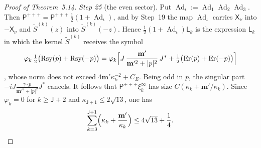 \documentclass[11pt]{amsart}
\theoremstyle{definition}
\begin{document}
\begin{proof}[Proof of Theorem~5.14]
\emph{Step 25} (the even sector).
Put $\operatorname{Ad}_\iota:=\allowbreak \operatorname{Ad}_1\operatorname{Ad}_2\operatorname{Ad}_3$.
Then $\mathsf P^{+++}=\allowbreak \mathsf P^{+++}\,\allowbreak \frac12(1+\operatorname{Ad}_\iota)$, and by Step~19 the map $\operatorname{Ad}_\iota$ carries $\mathsf X_\nu$ into $-\mathsf X_\nu$ and $\tilde S^{(k)}(z)$ into $\tilde S^{(k)}(-z)$.
Hence $\frac12(1+\operatorname{Ad}_\iota)\mathsf L_k$ is the expression $\mathsf L_k$ in which the kernel $\tilde S^{(k)}$ receives the symbol
\begin{equation*}
\varphi_k\,\tfrac12\bigl(\mathrm{Rsy}(p)+\mathrm{Rsy}(-p)\bigr)=\varphi_k\Bigl[J\,\frac{\mathbf m'}{\mathbf m'^2+|p|^2}\,J^*+\tfrac12\bigl(\mathrm{Er}(p)+\mathrm{Er}(-p)\bigr)\Bigr]
\end{equation*}
\cite[Proposition~37.1\,(f)]{QEDIII}, whose norm does not exceed $4\mathbf m'\kappa_k^{-2}+C_E$.
Being odd in $p$, the singular part $-iJ\frac{\gamma\cdot p}{\mathbf m'^2+|p|^2}J^*$ cancels.
It follows that $\mathsf P^{+++}\xi_k^\infty$ has size $C(\kappa_k+\mathbf m'/\kappa_k)$.
Since $\varphi_k=0$ for $k\ge\mathsf J+2$ and $\kappa_{\mathsf J+1}\le2\sqrt{13}$, one has
\begin{equation*}
\sum_{k=3}^{\mathsf J+1}\Bigl(\kappa_k+\frac{\mathbf m'}{\kappa_k}\Bigr)\le4\sqrt{13}+\frac14.
\end{equation*}


\end{proof}
\end{document}
